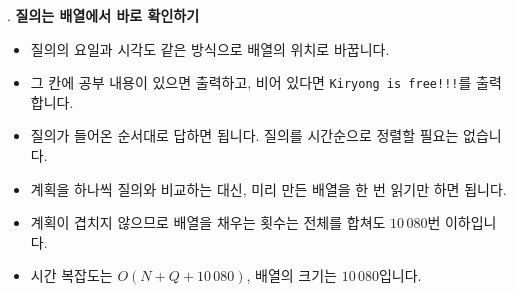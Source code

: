 \begin{frame}{\textbf{\pletter}. \ptitle}
    \textbf{질의는 배열에서 바로 확인하기}
\begin{itemize}
        \item 질의의 요일과 시각도 같은 방식으로 배열의 위치로 바꿉니다.
        \item 그 칸에 공부 내용이 있으면 출력하고, 비어 있다면 \texttt{Kiryong is free!!!}를 출력합니다.
        \item 질의가 들어온 순서대로 답하면 됩니다. 질의를 시간순으로 정렬할 필요는 없습니다.
        \item 계획을 하나씩 질의와 비교하는 대신, 미리 만든 배열을 한 번 읽기만 하면 됩니다.
        \item 계획이 겹치지 않으므로 배열을 채우는 횟수는 전체를 합쳐도 $10\,080$번 이하입니다.
        \item 시간 복잡도는 $O(N+Q+10\,080)$, 배열의 크기는 $10\,080$입니다.
    \end{itemize}
\end{frame}
